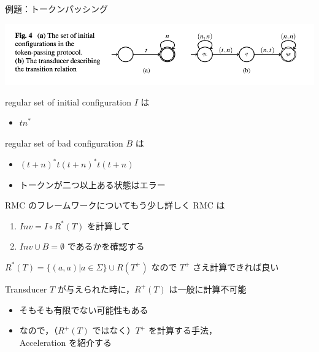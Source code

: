 \documentclass[presentation, xetex]{beamer}
\begin{document}
\begin{frame}[label={sec:org8b1a01e}]{例題：トークンパッシング}
\begin{center}
\includegraphics[width=.9\linewidth]{./images/token-example.png}
\end{center}


regular set of initial configuration \(I\) は
\begin{itemize}
\item \(t n^*\)
\end{itemize}


regular set of bad configuration \(B\) は
\begin{itemize}
\item \((t + n)^* t (t + n)^* t (t + n)\)
\item トークンが二つ以上ある状態はエラー
\end{itemize}
\end{frame}



\begin{frame}[label={sec:org13a4ba7}]{RMC のフレームワークについてもう少し詳しく}
RMC は
\begin{enumerate}
\item \(Inv = I \circ R^*(T)\) を計算して
\item \(Inv \cup B = \emptyset\) であるかを確認する
\end{enumerate}


\(R^*(T) = \{(a, a) | a \in \Sigma\} \cup R(T^+)\) なので
\alert{\alert{\(T^+\) さえ計算できれば良い}}


Transducer \(T\) が与えられた時に，\(R^+(T)\) は一般に計算不可能
\begin{itemize}
\item そもそも有限でない可能性もある
\item なので，（\(R^+(T)\) ではなく）\(T^+\) を計算する手法，\\
\alert{\alert{Acceleration}} を紹介する
\end{itemize}
\end{frame}
\end{document}
